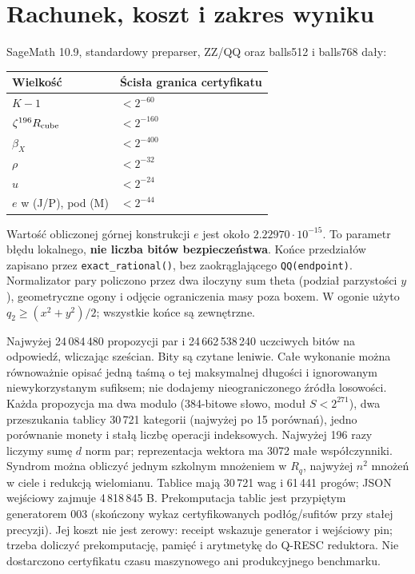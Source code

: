 \documentclass[11pt,a4paper]{article}
\newcommand{\code}[1]{\nolinkurl{#1}}
\begin{document}
\section{Rachunek, koszt i zakres wyniku}
SageMath 10.9, standardowy preparser, ZZ/QQ oraz balls512 i balls768 dały:
\begin{center}\begin{tabular}{ll}\toprule
Wielkość & Ścisła granica certyfikatu\\\midrule
$K-1$ & $<2^{-60}$\\
$\zeta^{196}R_{\rm cube}$ & $<2^{-160}$\\
$\beta_X$ & $<2^{-400}$\\
$\rho$ & $<2^{-32}$\\
$u$ & $<2^{-24}$\\
$e$ w (J/P), pod (M) & $<2^{-44}$\\\bottomrule
\end{tabular}\end{center}
Wartość obliczonej górnej konstrukcji $e$ jest około $2.22970\cdot10^{-15}$.
To parametr błędu lokalnego, \textbf{nie liczba bitów bezpieczeństwa}.
Końce przedziałów zapisano przez \code{exact_rational()}, bez zaokrąglającego
\code{QQ(endpoint)}. Normalizator pary policzono przez dwa iloczyny sum theta
(podział parzystości $y$), geometryczne ogony i odjęcie ograniczenia masy
poza boxem. W ogonie użyto $q_2\ge(x^2+y^2)/2$; wszystkie końce są zewnętrzne.

Najwyżej 24\,084\,480 propozycji par i 24\,662\,538\,240 uczciwych bitów
na odpowiedź, wliczając sześcian. Bity są czytane leniwie. Całe wykonanie można równoważnie opisać jedną
taśmą o tej maksymalnej długości i ignorowanym niewykorzystanym sufiksem;
nie dodajemy nieograniczonego źródła losowości.
Każda propozycja ma dwa modulo (384-bitowe słowo, moduł $S<2^{271}$),
dwa przeszukania tablicy 30\,721 kategorii (najwyżej po 15 porównań),
jedno porównanie monety i stałą liczbę operacji indeksowych.
Najwyżej 196 razy liczymy sumę $d$ norm par; reprezentacja wektora ma
3072 małe współczynniki. Syndrom można obliczyć jednym szkolnym mnożeniem
w $R_q$, najwyżej $n^2$ mnożeń w ciele i redukcją wielomianu.
Tablice mają 30\,721 wag i 61\,441 progów; JSON wejściowy zajmuje 4\,818\,845 B.
Prekomputacja tablic jest przypiętym generatorem 003 (skończony wykaz
certyfikowanych podłóg/sufitów przy stałej precyzji). Jej koszt nie jest
zerowy: receipt wskazuje generator i wejściowy pin; trzeba doliczyć
prekomputację, pamięć i arytmetykę do Q-RESC reduktora.
Nie dostarczono certyfikatu czasu maszynowego ani produkcyjnego benchmarku.
\end{document}
